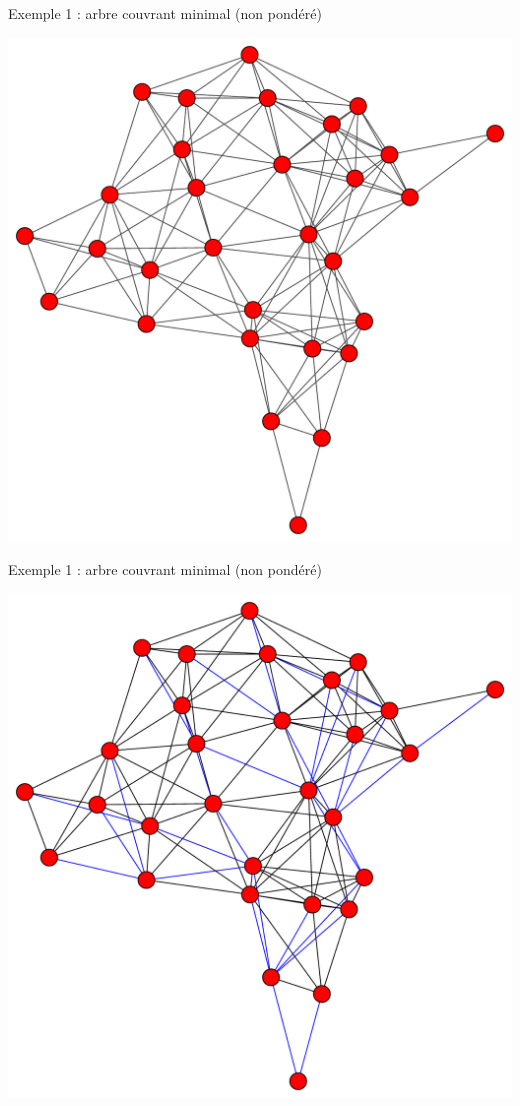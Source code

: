 \begin{frame}{Exemple 1 : arbre couvrant minimal (non pondéré)}
    \begin{center}
        \includegraphics[height=.8\textheight]{fig/mst-0.pdf}
    \end{center}
\end{frame}
\begin{frame}{Exemple 1 : arbre couvrant minimal (non pondéré)}
    \begin{center}
        \includegraphics[height=.8\textheight]{fig/mst-1.pdf}
    \end{center}
\end{frame}
